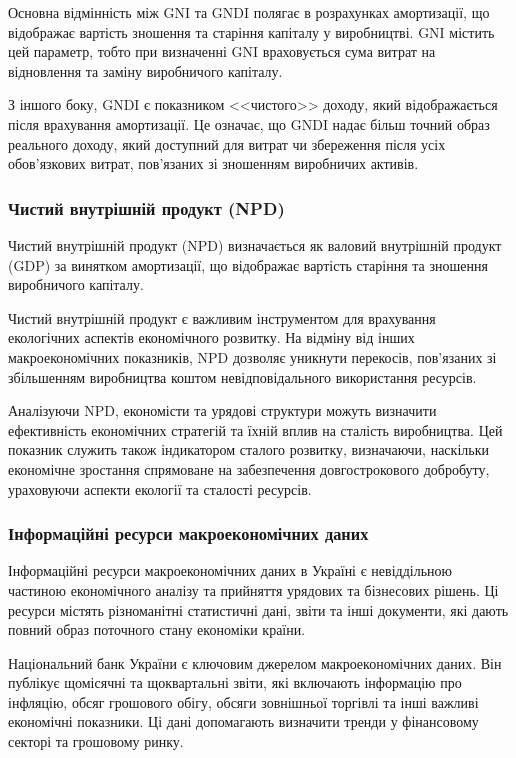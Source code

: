 Основна відмінність між GNI та GNDI полягає в розрахунках амортизації, що відображає вартість зношення та старіння капіталу у виробництві. GNI містить цей параметр, тобто при визначенні GNI враховується сума витрат на відновлення та заміну виробничого капіталу.

З іншого боку, GNDI є показником <<чистого>> доходу, який відображається після врахування амортизації. Це означає, що GNDI надає більш точний образ реального доходу, який доступний для витрат чи збереження після усіх обов'язкових витрат, пов'язаних зі зношенням виробничих активів.

\subsubsection*{Чистий внутрішній продукт (NPD)}

Чистий внутрішній продукт (NPD) визначається як валовий внутрішній продукт (GDP) за винятком амортизації, що відображає вартість старіння та зношення виробничого капіталу.

Чистий внутрішній продукт є важливим інструментом для врахування екологічних аспектів економічного розвитку. На відміну від інших макроекономічних показників, NPD дозволяє уникнути перекосів, пов'язаних зі збільшенням виробництва коштом невідповідального використання ресурсів.

Аналізуючи NPD, економісти та урядові структури можуть визначити ефективність економічних стратегій та їхній вплив на сталість виробництва. Цей показник служить також індикатором сталого розвитку, визначаючи, наскільки економічне зростання спрямоване на забезпечення довгострокового добробуту, ураховуючи аспекти екології та сталості ресурсів.

\subsubsection{Інформаційні ресурси макроекономічних даних}

Інформаційні ресурси макроекономічних даних в Україні є невіддільною частиною економічного аналізу та прийняття урядових та бізнесових рішень. Ці ресурси містять різноманітні статистичні дані, звіти та інші документи, які дають повний образ поточного стану економіки країни.

Національний банк України є ключовим джерелом макроекономічних даних. Він публікує щомісячні та щоквартальні звіти, які включають інформацію про інфляцію, обсяг грошового обігу, обсяги зовнішньої торгівлі та інші важливі економічні показники. Ці дані допомагають визначити тренди у фінансовому секторі та грошовому ринку.

